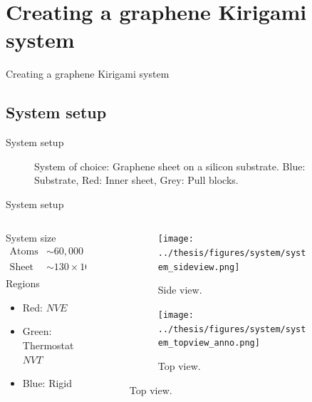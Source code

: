 \documentclass[
	10pt, %
]{beamer}
\begin{document}
\section{Creating a graphene Kirigami system} %
\begin{frame}{Creating a graphene Kirigami system}
    \tableofcontents[currentsection]
\end{frame}


\subsection{System setup}
\begin{frame}{System setup}
	\begin{figure}
		\centering    
		\caption{System of choice: Graphene sheet on a silicon substrate. Blue: Substrate, Red: Inner sheet, Grey: Pull blocks. }
	\end{figure} 
\end{frame}
%
%
\begin{frame}{System setup}
	\begin{columns} 
		\hspace{5mm}
		\begin{column}{.4\textwidth}
			System size
			\begin{align*}
				\text{Atoms} &\sim 60,000 \\
				\text{Sheet} &\sim 130 \times \SI{165}{\text{Å}} \\
			\end{align*}
			Regions
			\begin{itemize}
				\item Red: $NVE$
				\item Green: Thermostat $NVT$
				\item Blue: Rigid 
			\end{itemize}
		\end{column}
		\begin{column}{.5\textwidth}
			\begin{figure}[H]
				\raggedright
				\begin{subfigure}[b]{0.9\textwidth}
					\centering
					\texttt{[image: ../thesis/figures/system/system\_sideview.png]}
					\caption{Side view.}
				\end{subfigure}
				\begin{subfigure}[b]{0.9\textwidth}
					\centering
					\texttt{[image: ../thesis/figures/system/system\_topview\_anno.png]}
					\caption{Top view.}
				\end{subfigure}
			\end{figure}
		\end{column}%
	\end{columns}


	
\end{frame}
\end{document}
